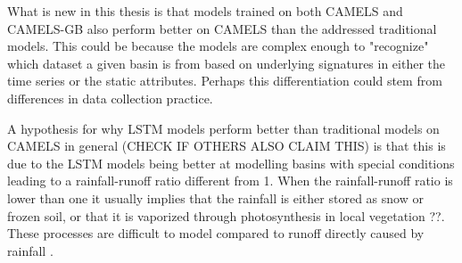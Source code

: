 What is new in this thesis is that models trained on both CAMELS and CAMELS-GB 
also perform better on CAMELS than the addressed traditional models. This could 
be because the models are complex enough to "recognize" which dataset a given 
basin is from based on underlying signatures in either the time series or the 
static attributes. Perhaps this differentiation could stem from differences in 
data collection practice. 

A hypothesis for why LSTM models perform better than traditional models on CAMELS in general
(CHECK IF OTHERS ALSO CLAIM THIS) \citationneeded is that this is due to the LSTM 
models being better at modelling basins with special conditions leading to 
a rainfall-runoff ratio different from 1. When the rainfall-runoff ratio is lower 
than one it usually implies that the rainfall is either stored as snow or frozen 
soil, or that it is vaporized through photosynthesis in local vegetation \citationneeded ??. 
These processes are difficult to model compared to runoff directly caused by 
rainfall \citationneeded.
